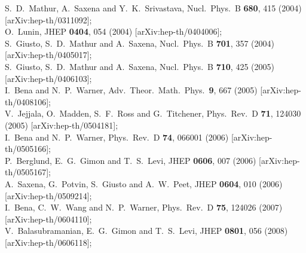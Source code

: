 \documentclass[11pt]{article}
\begin{document}
\begin{thebibliography}{10}
S.~D.~Mathur, A.~Saxena and Y.~K.~Srivastava,
  Nucl.\ Phys.\ B {\bf 680}, 415 (2004)
  [arXiv:hep-th/0311092];\\
O.~Lunin,
  JHEP {\bf 0404}, 054 (2004)
  [arXiv:hep-th/0404006];\\
S.~Giusto, S.~D.~Mathur and A.~Saxena,
  Nucl.\ Phys.\ B {\bf 701}, 357 (2004)
  [arXiv:hep-th/0405017];\\
S.~Giusto, S.~D.~Mathur and A.~Saxena,
  Nucl.\ Phys.\  B {\bf 710}, 425 (2005)
  [arXiv:hep-th/0406103];\\
I.~Bena and N.~P.~Warner,
  Adv.\ Theor.\ Math.\ Phys.\  {\bf 9}, 667 (2005)
  [arXiv:hep-th/0408106];\\
V.~Jejjala, O.~Madden, S.~F.~Ross and G.~Titchener,
  Phys.\ Rev.\  D {\bf 71}, 124030 (2005)
  [arXiv:hep-th/0504181];\\
I.~Bena and N.~P.~Warner,
  Phys.\ Rev.\  D {\bf 74}, 066001 (2006)
  [arXiv:hep-th/0505166];\\
P.~Berglund, E.~G.~Gimon and T.~S.~Levi,
  JHEP {\bf 0606}, 007 (2006)
  [arXiv:hep-th/0505167];\\
A.~Saxena, G.~Potvin, S.~Giusto and A.~W.~Peet,
  JHEP {\bf 0604}, 010 (2006)
  [arXiv:hep-th/0509214];\\
I.~Bena, C.~W.~Wang and N.~P.~Warner,
  Phys.\ Rev.\  D {\bf 75}, 124026 (2007)
  [arXiv:hep-th/0604110];\\
V.~Balasubramanian, E.~G.~Gimon and T.~S.~Levi,
  JHEP {\bf 0801}, 056 (2008)
  [arXiv:hep-th/0606118];\\

\end{thebibliography}
\end{document}
